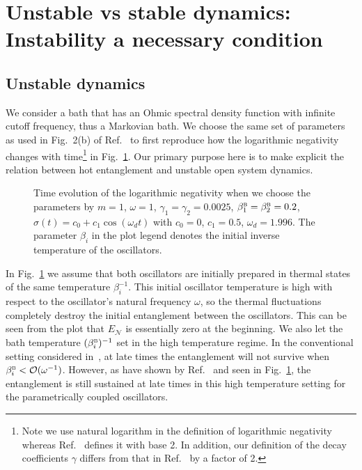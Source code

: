 \documentclass[11pt,a4paper]{article}
\begin{document}
\section{Unstable vs stable dynamics: Instability a necessary condition}\label{numer-ohmic}


\subsection{Unstable dynamics}

We consider a bath that has an Ohmic spectral density function with infinite cutoff frequency,  thus a Markovian bath.  We choose the same set of parameters as used in Fig.~2(b) of Ref.~\cite{galve-prl} to first reproduce how the logarithmic negativity changes with time\footnote{Note  we use natural logarithm in the definition of logarithmic negativity whereas Ref.~\cite{galve-prl}  defines it with base 2. In addition, our definition of the decay coefficients $\gamma$  differs from that in Ref.~\cite{galve-prl} by a factor of 2.} in Fig.~\ref{fig:logneg-galve}. Our primary purpose here is to make explicit the relation between hot entanglement and unstable open system dynamics. 

 

 \begin{figure}[h!]
 	\centering
	\caption{\label{fig:logneg-galve} Time evolution of the logarithmic negativity when we choose the parameters by $m = 1$, $ \omega = 1$, $\gamma_{1}=\gamma_{2}= 0.0025$, $\beta_{1}^{\textsc{b}}=\beta_{2}^{\textsc{b}}= 0.2$, $\sigma(t) = c_0 + c_1\cos(\omega_d t)$ with $c_0 = 0$, $c_1 = 0.5$, $\omega_d = 1.996$. The parameter $\beta_i$ in the plot legend denotes the initial inverse temperature of the oscillators.}
 \end{figure}




In Fig.~\ref{fig:logneg-galve} we assume that both oscillators are initially prepared in thermal states of the same temperature $\beta_i^{-1}$. This initial oscillator temperature is high with respect to the oscillator's natural frequency $\omega$, so the thermal fluctuations completely destroy the initial entanglement between the oscillators. This can be seen from the plot that $E_{\mathcal{N}}$ is essentially zero at the beginning.  We also let the bath temperature $(\beta_{i}^{\textsc{b}}){^{-1}}$ set in the high temperature regime. In the conventional setting considered in~\cite{HH15PRD},  at late times the entanglement will not survive when $\beta^{\textsc{b}}_{i}<\mathcal{O}(\omega^{-1})$. However, as have shown by Ref.~\cite{galve-prl} and seen in Fig.~\ref{fig:logneg-galve}, the entanglement is still sustained at late times in this high temperature setting for the parametrically coupled oscillators.
\end{document}
